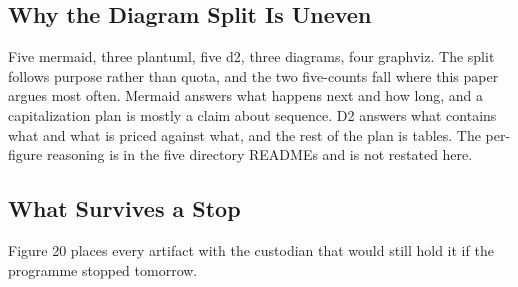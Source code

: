 \subsection{Why the Diagram Split Is Uneven}

Five mermaid, three plantuml, five d2, three diagrams, four graphviz. The split
follows purpose rather than quota, and the two five-counts fall where this paper
argues most often. Mermaid answers what happens next and how long, and a
capitalization plan is mostly a claim about sequence. D2 answers what contains
what and what is priced against what, and the rest of the plan is tables. The
per-figure reasoning is in the five directory READMEs and is not restated here.

\subsection{What Survives a Stop}

Figure 20 places every artifact with the custodian that would still hold it if
the programme stopped tomorrow.

